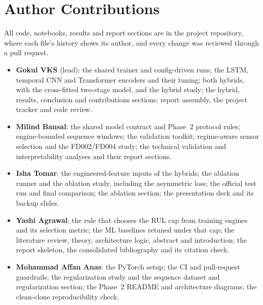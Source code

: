 
\section*{Author Contributions}
All code, notebooks, results and report sections are in the project
repository, where each file's history shows its author, and every change was
reviewed through a pull request.
\begin{itemize}
\item \textbf{Gokul VKS} (lead): the shared trainer and config-driven runs; the
  LSTM, temporal CNN and Transformer encoders and their tuning; both hybrids,
  with the cross-fitted two-stage model, and the hybrid study; the hybrid,
  results, conclusion and contributions sections; report assembly, the project
  tracker and code review.
\item \textbf{Milind Bansal}: the shared model contract and Phase~2 protocol
  rules; engine-bounded sequence windows; the validation toolkit; regime-aware
  sensor selection and the FD002/FD004 study; the technical validation and
  interpretability analyses and their report sections.
\item \textbf{Isha Tomar}: the engineered-feature inputs of the hybrids; the
  ablation runner and the ablation study, including the asymmetric loss; the
  official test run and final comparison; the ablation section; the
  presentation deck and its backup slides.
\item \textbf{Yashi Agrawal}: the rule that chooses the RUL cap from training
  engines and its selection metric; the ML baselines retuned under that cap;
  the literature review, theory, architecture logic, abstract and introduction;
  the report skeleton, the consolidated bibliography and its citation check.
\item \textbf{Mohammad Affan Anas}: the PyTorch setup; the CI and pull-request
  guardrails; the regularization study and the sequence dataset and
  regularization section; the Phase~2 README and architecture diagrams; the
  clean-clone reproducibility check.
\end{itemize}
